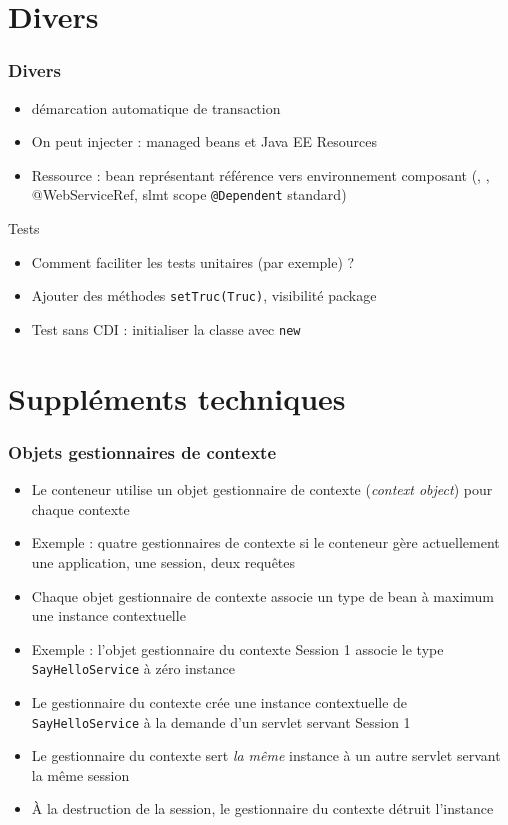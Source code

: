 \documentclass[english, french]{beamer}
\begin{document}
\section{Divers}
\begin{frame}
	\frametitle{Divers}
	\begin{itemize}
		\item {} démarcation automatique de transaction
		\item On peut injecter : managed beans et Java EE Resources
		\item Ressource : bean représentant référence vers environnement composant (, , {\tiny @WebServiceRef, slmt scope \texttt{@Dependent} standard})
	\end{itemize}
	\begin{block}{Tests}
		\begin{itemize}
			\item Comment faciliter les tests unitaires (par exemple) ? \pause
			\item Ajouter des méthodes \texttt{setTruc(Truc)}, visibilité package
			\item Test sans CDI : initialiser la classe avec \texttt{new}
		\end{itemize}
	\end{block}
\end{frame}

\appendix
\section{Suppléments techniques}
\begin{frame}
	\frametitle{Objets gestionnaires de contexte}
	\begin{itemize}
		\item Le conteneur utilise un objet gestionnaire de contexte (\emph{context object}) pour chaque contexte
		\item Exemple : quatre gestionnaires de contexte si le conteneur gère actuellement une application, une session, deux requêtes
		\item Chaque objet gestionnaire de contexte associe un type de bean à maximum une instance contextuelle
		\item Exemple : l’objet gestionnaire du contexte \og{}Session 1\fg{} associe le type \texttt{SayHelloService} à zéro instance
		\item Le gestionnaire du contexte crée une instance contextuelle de \texttt{SayHelloService} à la demande d’un servlet servant \og{}Session 1\fg{}
		\item Le gestionnaire du contexte sert \emph{la même} instance à un autre servlet servant la même session
		\item À la destruction de la session, le gestionnaire du contexte détruit l’instance
	\end{itemize}
\end{frame}
\end{document}
